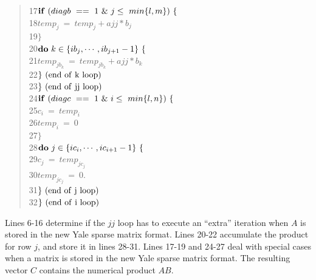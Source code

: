 \begin{quote}
17\hspace*{12em}$         {\bf if}\ (diagb\ ==\ 1\ \&\ j \leq\ min\{l,m\})\ \{ $ \\
18\hspace*{16em}$             temp_{j}\ =\ temp_{j} + ajj * b_{j} $ \\
19\hspace*{16em}$             \} $ \\
20\hspace*{12em}$         {\bf do}\ k\in\{ib_{j},\cdots,ib_{j+1}-1\}\ \{ $ \\
21\hspace*{16em}$             temp_{jb_{k}}\ =\ temp_{jb_{k}} + ajj * b_{k} $ \\
22\hspace*{16em}$             \}\ (\rm end\ of\ k\ loop) $ \\
23\hspace*{12em}$         \}\ (\rm end\ of\ jj\ loop) $ \\
24\hspace*{ 8em}$     {\bf if}\ (diagc\ ==\ 1 \ \&\ i \leq\ min\{l,n\})\ \{ $ \\
25\hspace*{12em}$         c_{i}\ =\ temp_{i} $ \\
26\hspace*{12em}$         temp_{i}\ =\ 0 $ \\
27\hspace*{12em}$         \} $ \\
28\hspace*{ 8em}$     {\bf do}\  j\in\{ic_{i},\cdots,ic_{i+1}-1\}\ \{ $ \\
29\hspace*{12em}$         c_{j}\ =\ temp_{jc_{j}} $ \\
30\hspace*{12em}$         temp_{jc_{j}}\ =\ 0. $ \\
31\hspace*{12em}$         \}\ (\rm end\ of\ j\ loop) $ \\
32\hspace*{ 8em}$     \}\ (\rm end\ of\ i\ loop) $
\end{quote}     
Lines 6-16 determine if the $jj$ loop has to execute an ``extra'' iteration
when $A$ is stored in the new Yale sparse matrix format.  Lines 20-22
accumulate the product for row $j$, and store it in lines 28-31.  Lines 17-19
and 24-27 deal with special cases when a matrix is stored in the new Yale
sparse matrix format.  The resulting vector $C$ contains the numerical product
$AB$.
 
